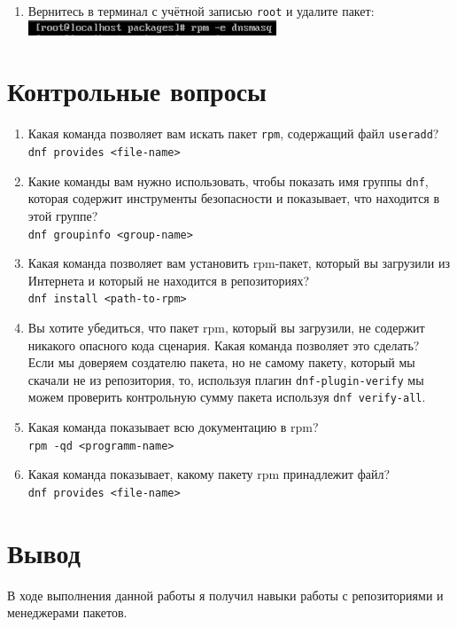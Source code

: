 \documentclass[12pt]{article}
\begin{document}
\begin{enumerate}
	\item Вернитесь в терминал с учётной записью \texttt{root} и удалите пакет:
	      \\\includegraphics{15.png}
\end{enumerate}

\section{Контрольные вопросы}
\begin{enumerate}
	\item Какая команда позволяет вам искать пакет \texttt{rpm}, содержащий файл \texttt{useradd}?\\
	      \texttt{dnf provides <file-name>}
	\item Какие команды вам нужно использовать, чтобы показать имя группы \texttt{dnf}, которая содержит инструменты безопасности и показывает, что находится в этой группе?\\
	      \texttt{dnf groupinfo <group-name>}
	\item Какая команда позволяет вам установить rpm-пакет, который вы загрузили из Интернета и который не находится в репозиториях?\\
	      \texttt{dnf install <path-to-rpm>}
	\item Вы хотите убедиться, что пакет rpm, который вы загрузили, не содержит никакого опасного кода сценария. Какая команда позволяет это сделать?\\
	      Если мы доверяем создателю пакета, но не самому пакету, который мы скачали не из репозитория, то, используя плагин \texttt{dnf-plugin-verify} мы можем проверить контрольную сумму пакета используя \texttt{dnf verify-all}.
	\item Какая команда показывает всю документацию в rpm?\\
	      \texttt{rpm -qd <programm-name>}
	\item Какая команда показывает, какому пакету rpm принадлежит файл?\\
	      \texttt{dnf provides <file-name>}
\end{enumerate}

\section{Вывод}
В ходе выполнения данной работы я получил навыки работы с репозиториями и менеджерами пакетов.
\end{document}
